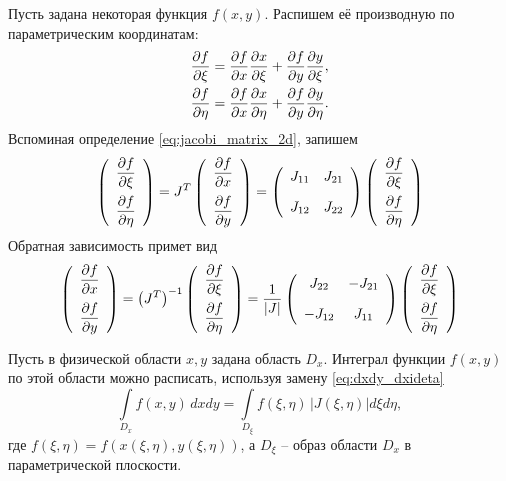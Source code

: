 Пусть задана некоторая функция $f(x, y)$. Распишем её производную по
параметрическим координатам:
\begin{align*}
&\frac{\partial f}{\partial \xi} = \frac{\partial f}{\partial x}\frac{\partial x}{\partial \xi} + \frac{\partial f}{\partial y}\frac{\partial y}{\partial \xi}, \\
&\frac{\partial f}{\partial \eta} = \frac{\partial f}{\partial x}\frac{\partial x}{\partial \eta} + \frac{\partial f}{\partial y}\frac{\partial y}{\partial \eta}.
\end{align*}
Вспоминая определение \cref{eq:jacobi_matrix_2d}, запишем
\begin{equation*}
\left(\begin{array}{c}
  \dfrac{\partial f}{\partial \xi} \\[10pt]
  \dfrac{\partial f}{\partial \eta}
  \end{array}
\right) = 
J^T 
\left(
  \begin{array}{c}
  \dfrac{\partial f}{\partial x} \\[10pt]
  \dfrac{\partial f}{\partial y}
  \end{array}
\right) =
\left(
  \begin{array}{cc}
    J_{11} & J_{21} \\[10pt]
    J_{12} & J_{22}
  \end{array}
\right)
\left(
  \begin{array}{c}
  \dfrac{\partial f}{\partial \xi} \\[10pt]
  \dfrac{\partial f}{\partial \eta}
  \end{array}
\right)
\end{equation*}
Обратная зависимость примет вид
\begin{equation*}
\left(\begin{array}{c}
  \dfrac{\partial f}{\partial x} \\[10pt]
  \dfrac{\partial f}{\partial y}
  \end{array}
\right) = 
\left(J^T\right)^{-1}
\left(
  \begin{array}{c}
  \dfrac{\partial f}{\partial \xi} \\[10pt]
  \dfrac{\partial f}{\partial \eta}
  \end{array}
\right) =
\frac{1}{|J|}
\left(
  \begin{array}{cc}
    J_{22} & -J_{21} \\[10pt]
    -J_{12} & J_{11}
  \end{array}
\right)
\left(
  \begin{array}{c}
  \dfrac{\partial f}{\partial \xi} \\[10pt]
  \dfrac{\partial f}{\partial \eta}
  \end{array}
\right)
\end{equation*}

Пусть в физической области $x, y$ задана область $D_x$.
Интеграл функции $f(x, y)$ по этой области
можно расписать, используя замену \cref{eq:dxdy_dxideta}
\begin{equation}
\label{eq:dxideta_integral}
\int\limits_{D_{x}}f(x, y)\,dxdy = \int\limits_{D_{\xi}}f(\xi, \eta) \, |J(\xi, \eta)|d\xi d\eta,
\end{equation}
где $f(\xi, \eta) = f(x(\xi, \eta), y(\xi, \eta))$, а $D_\xi$ -- образ области $D_x$ в параметрической плоскости.

